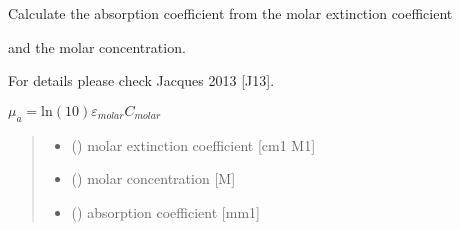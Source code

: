 \documentclass[letterpaper,10pt,english]{sphinxmanual}
\begin{document}

\begin{fulllineitems}
\label{\detokenize{03_absorption_coefficient:skinoptics.absorption_coefficient.mua_from_molarext_and_Cmolar}}
\pysigstartsignatures
{}
\pysigstopsignatures
\begin{DUlineblock}{0em}
\item[] Calculate the absorption coefficient from the molar extinction coefficient
\item[] and the molar concentration.
\item[] For details please check Jacques 2013 {[}J13{]}.
\end{DUlineblock}

\sphinxAtStartPar
\(\mu_a = \mbox{ln}(10) \varepsilon_{molar} C_{molar}\)
\begin{quote}\begin{description}
\begin{itemize}
\item {} 
\sphinxAtStartPar
{} () \textendash{} molar extinction coefficient {[}cm\sphinxhyphen{}1 M\sphinxhyphen{}1{]}

\item {} 
\sphinxAtStartPar
{} () \textendash{} molar concentration {[}M{]}

\end{itemize}

\sphinxAtStartPar
\begin{itemize}
\item {} 
\sphinxAtStartPar
{} () \textendash{} absorption coefficient {[}mm\sphinxhyphen{}1{]}

\end{itemize}


\end{description}\end{quote}

\end{fulllineitems}
\end{document}
